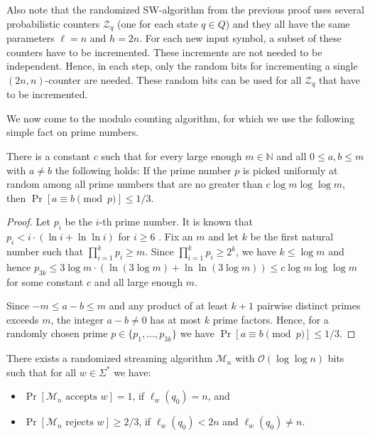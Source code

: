 \documentclass{theoretics}
\newcommand{\M}{\mathcal{M}}
\renewcommand{\O}{\mathcal{O}}
\newcommand{\BZ}{\mathcal{Z}}
\renewcommand{\geq}{\geqslant}
\renewcommand{\leq}{\leqslant}
\renewcommand{\ge}{\geq}
\renewcommand{\le}{\leq}
\begin{document}
Also note that the randomized SW-algorithm from the previous proof 
uses several probabilistic counters $\BZ_q$ (one for each state $q \in Q$) and they all have the same parameters $\ell = n$ and $h = 2n$.
For each new input symbol, a subset of these counters have to be incremented. These increments are not needed to be independent. 
Hence, in each step, only the random bits for incrementing a single $(2n,n)$-counter are needed. These random bits can be used for all $\BZ_q$ that have to be incremented. 


We now come to the modulo counting algorithm, for which we use the following simple fact on prime numbers.

\begin{lemma} \label{lemma-primes}
There is a constant $c$ such that for every large enough $m \in \mathbb{N}$ and all $0 \leq a,b \le m$ with $a \neq b$ the following holds: If the prime number $p$ is picked uniformly
at random among all prime numbers that are no greater than $c \log m \log \log m$, then $\Pr[a \equiv b \pmod p] \leq 1/3$.
\end{lemma}

\begin{proof}
Let $p_i$ be the $i$-th prime number.
It is known that 
$p_i < i \cdot  (\ln i + \ln\ln i)$ for $i \geq 6$ \cite[3.13]{RosserS62}. 
Fix an $m$ and
let $k$ be the first natural number such that $\prod_{i=1}^k p_i \ge m$. Since  
$\prod_{i=1}^k p_i \geq 2^k$, we have $k \le \log m$ and hence $p_{3k} \leq
3 \log m \cdot (\ln (3 \log m) + \ln\ln(3 \log m)) \leq c \log m \log \log m$ for some constant $c$
and all large enough $m$.

Since $-m \le a - b \le m$ and any product of at least $k+1$ pairwise distinct primes
exceeds $m$, the integer $a - b \neq 0$ has at most $k$ prime factors. Hence, for a randomly chosen prime
$p \in \{p_1, \dots, p_{3k}\}$ we have $\Pr[a \equiv b \pmod p] \leq 1/3$.  
\end{proof}


\begin{lemma}
	\label{lem:modulocounting}
	There exists a randomized streaming algorithm $\M_n$ with $\O(\log \log n)$ bits
	such that for all $w \in \Sigma^*$ we have:
	\begin{itemize}
		\item $\Pr[\M_n \text{ accepts } w] = 1$, if $\ell_w(q_0) = n$, and
		\item $\Pr[\M_n \text{ rejects } w] \ge 2/3$, if $\ell_w(q_0) < 2n$ and $\ell_w(q_0) \neq n$.
	\end{itemize}
\end{lemma}
\end{document}
